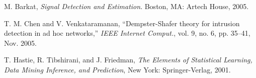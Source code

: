 \documentclass[journal]{IEEEtran}
\begin{document}
\begin{thebibliography}{1}
 M. Barkat, \textit{Signal Detection and Estimation}. Boston, MA: Artech House, 2005.


 T. M. Chen and V. Venkataramanan, ``Dempster-Shafer theory for intrusion detection in ad hoc networks,'' \emph{IEEE Internet Comput.}, vol. 9, no. 6, pp. 35--41, Nov. 2005.

 T. Hastie, R. Tibshirani, and J. Friedman, \emph{The Elements of Statistical
Learning, Data Mining Inference, and Prediction}, New York: Springer-Verlag, 2001.


\end{thebibliography}
\end{document}
